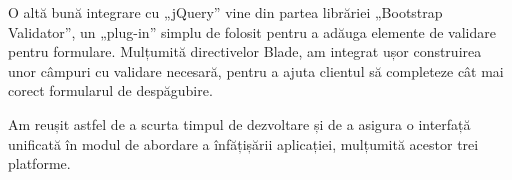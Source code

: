	O altă bună integrare cu „jQuery” vine din partea librăriei „Bootstrap Validator”, un „plug-in” simplu de folosit pentru a adăuga elemente de validare pentru formulare. \cite{boostrap_validator}
	Mulțumită directivelor Blade, am integrat ușor construirea unor câmpuri cu validare necesară, pentru a ajuta clientul să completeze cât mai corect formularul de despăgubire.

	Am reușit astfel de a scurta timpul de dezvoltare și de a asigura o interfață unificată în modul de abordare a înfățișării aplicației, mulțumită acestor trei platforme.
